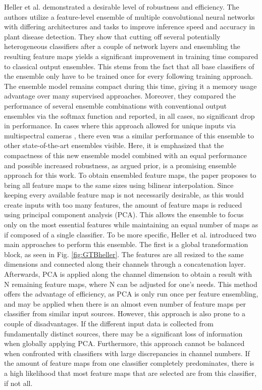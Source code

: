 Heller et al. \cite{EnsembleHeller2023} demonstrated a desirable level of robustness and efficiency. The authors utilize a feature-level ensemble of multiple 
convolutional neural networks with differing architectures and tasks to improve inference speed and accuracy in plant disease detection.
They show that cutting off several potentially heterogeneous classifiers after a couple of network layers and ensembling the 
resulting feature maps yields a significant improvement in training time compared to classical output ensembles. This stems from 
the fact that all base classifiers of the ensemble only have to be trained once for every following training approach. The ensemble 
model remains compact during this time, giving it a memory usage advantage over many supervised approaches. 
Moreover, they compared the performance of several ensemble combinations with conventional 
output ensembles via the softmax function and reported, in all cases, no significant drop in performance. In cases where this approach allowed for 
unique inputs via multispectral cameras \cite{EnsembleHeller2023}, there even was a similar performance of this ensemble to other state-of-the-art ensembles visible. Here, it is emphasized that the compactness of this new ensemble model combined with an equal performance and possible 
increased robustness, as argued prior, is a promising ensemble approach for this work.\newline
To obtain ensembled feature maps, the paper proposes to bring all feature maps to the same sizes using bilinear interpolation. Since 
keeping every available feature map is not necessarily desirable, as this would create inputs with too many features, the amount of feature 
maps is reduced using principal component analysis (PCA). This allows the ensemble to focus only on the most essential features while maintaining 
an equal number of maps as if composed of a single classifier. To be more specific, Heller et al. \cite{EnsembleHeller2023} introduced two main 
approaches to perform this ensemble. The first is a global transformation block, as seen in Fig. \ref{fig:GTBheller}. 
The features are all resized to the same dimensions and connected along their channels through a concatenation layer.
Afterwards, PCA is applied along the channel dimension to obtain a result with N remaining feature maps, where N can be adjusted for one's 
needs. This method offers the advantage of efficiency, as PCA is only run once per feature ensembling, and may be applied when there is 
an almost even number of feature maps per classifier from similar input sources. However, this approach is also 
prone to a couple of disadvantages. If the different input data is collected from fundamentally distinct sources, there may be a significant 
loss of information when globally applying PCA. Furthermore, this approach cannot be balanced when confronted with classifiers with large 
discrepancies in channel numbers. If the amount of feature maps from one classifier completely predominates, there is a high likelihood 
that most feature maps that are selected are from this classifier, if not all.

